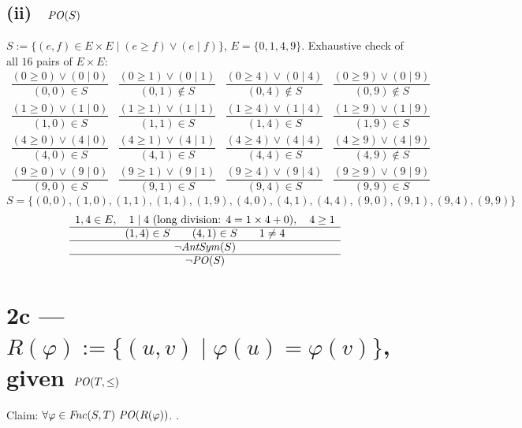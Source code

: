 \documentclass[11pt]{article}
\newcommand{\op}[1]{\mathit{#1}}
\newcommand{\Fnc}{\op{Fnc}} \newcommand{\Inj}{\op{Inj}} \newcommand{\Srj}{\op{Srj}}
\newcommand{\seclabel}[1]{\noindent\fbox{\textbf{#1}}\par\smallskip}
\begin{document}
\subsection*{(ii) \circn\ $\PO(S)$}
\seclabel{2b.ii}
$S:=\{(e,f)\in E\times E\mid(e\ge f)\vee(e\mid f)\}$, $E=\{0,1,4,9\}$. Exhaustive check of all $16$ pairs of $E\times E$:
\begingroup\scriptsize
\[
\begin{array}{cccc}
\dfrac{(0\ge0)\vee(0\mid0)}{(0,0)\in S} & \dfrac{(0\ge1)\vee(0\mid1)}{(0,1)\notin S} & \dfrac{(0\ge4)\vee(0\mid4)}{(0,4)\notin S} & \dfrac{(0\ge9)\vee(0\mid9)}{(0,9)\notin S} \\[3mm]
\dfrac{(1\ge0)\vee(1\mid0)}{(1,0)\in S} & \dfrac{(1\ge1)\vee(1\mid1)}{(1,1)\in S} & \dfrac{(1\ge4)\vee(1\mid4)}{(1,4)\in S} & \dfrac{(1\ge9)\vee(1\mid9)}{(1,9)\in S} \\[3mm]
\dfrac{(4\ge0)\vee(4\mid0)}{(4,0)\in S} & \dfrac{(4\ge1)\vee(4\mid1)}{(4,1)\in S} & \dfrac{(4\ge4)\vee(4\mid4)}{(4,4)\in S} & \dfrac{(4\ge9)\vee(4\mid9)}{(4,9)\notin S} \\[3mm]
\dfrac{(9\ge0)\vee(9\mid0)}{(9,0)\in S} & \dfrac{(9\ge1)\vee(9\mid1)}{(9,1)\in S} & \dfrac{(9\ge4)\vee(9\mid4)}{(9,4)\in S} & \dfrac{(9\ge9)\vee(9\mid9)}{(9,9)\in S}
\end{array}
\]
\endgroup
\[
S = \{(0,0),(1,0),(1,1),(1,4),(1,9),(4,0),(4,1),(4,4),(9,0),(9,1),(9,4),(9,9)\}
\]
\[
\begin{array}{c}
1,4\in E,\quad 1\mid4\ \text{(long division: }4=1\times4+0\text{)},\quad 4\ge1\\
\hline
(1,4)\in S \qquad (4,1)\in S \qquad 1\ne4\\
\hline
\neg\op{AntSym}(S)\\
\hline
\neg\PO(S)
\end{array}
\]

\clearpage
\section*{2c --- $R(\varphi):=\{(u,v)\mid \varphi(u)=\varphi(v)\}$, given $\PO(T,\le)$}
\seclabel{2c}
Claim: $\forall\varphi\in\Fnc(S,T)\ \PO(R(\varphi))$. \circn.
\end{document}
